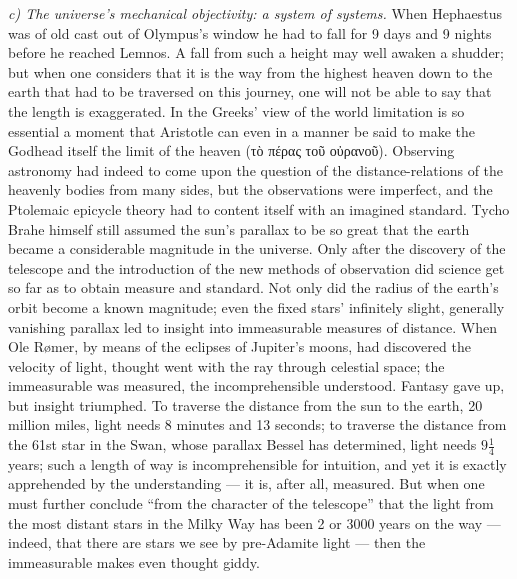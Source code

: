 \documentclass[12pt,a4paper]{book}
\newcommand{\runin}[1]{\emph{#1}\hspace{0.4em}}
\begin{document}
\runin{c) The universe's mechanical objectivity: a system of systems.} When Hephaestus was of old cast out
of Olympus's window he had to fall for 9 days and 9 nights before he reached Lemnos. A fall from such a
height may well awaken a shudder; but when one considers that it is the way from the highest heaven down to
the earth that had to be traversed on this journey, one will not be able to say that the length is
exaggerated. In the Greeks' view of the world limitation is so essential a moment that Aristotle can even
in a manner be said to make the Godhead itself
the limit of the heaven (τὸ πέρας τοῦ οὐρανοῦ). Observing astronomy had indeed to come upon the question of
the distance-relations of the heavenly bodies from many sides, but the observations were imperfect, and the
Ptolemaic epicycle theory had to content itself with an imagined standard. Tycho Brahe himself still assumed
the sun's parallax to be so great that the earth became a considerable magnitude in the universe. Only after
the discovery of the telescope and the introduction of the new methods of observation did science get so far
as to obtain measure and standard. Not only did the radius of the earth's orbit become a known magnitude;
even the fixed stars' infinitely slight, generally vanishing parallax led to insight into immeasurable
measures of distance. When Ole Rømer, by means of the eclipses of Jupiter's moons, had discovered the
velocity of light, thought went with the ray through celestial space; the immeasurable was measured, the
incomprehensible understood. Fantasy gave up, but insight triumphed. To traverse the distance from the sun to
the earth, 20 million miles, light needs 8 minutes and 13 seconds; to traverse the distance from the 61st
star in the Swan, whose parallax Bessel has determined,
light needs $9\tfrac{1}{4}$ years; such a
length of way is incomprehensible for intuition, and yet it is exactly apprehended by the understanding --- it
is, after all, measured. But when one must further conclude ``from the character of the telescope'' that the
light from the most distant stars in the Milky Way has been 2 or 3000 years on the way --- indeed, that there
are stars we see by pre-Adamite light --- then the immeasurable makes even thought giddy.
\end{document}
